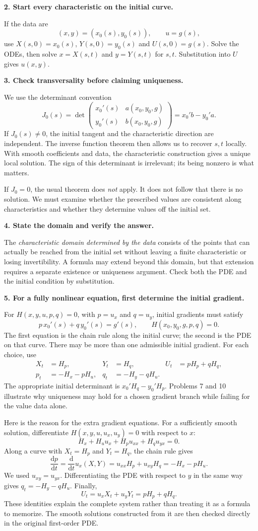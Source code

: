 \documentclass[11pt,a4paper]{article}
\newcommand{\step}[1]{\par\medskip\textbf{#1}\par}
\begin{document}
\step{2. Start every characteristic on the initial curve.}
If the data are
\[
 (x,y)=(x_0(s),y_0(s)),\qquad u=g(s),
\]
use $X(s,0)=x_0(s)$, $Y(s,0)=y_0(s)$ and $U(s,0)=g(s)$.
Solve the ODEs, then solve $x=X(s,t)$ and $y=Y(s,t)$ for $s,t$. Substitution into $U$ gives $u(x,y)$.

\step{3. Check transversality before claiming uniqueness.}
We use the determinant convention
\[
 J_0(s)=\det\begin{pmatrix}x_0'(s)&a(x_0,y_0,g)\\y_0'(s)&b(x_0,y_0,g)\end{pmatrix}
       =x_0'b-y_0'a.
\]
If $J_0(s)\ne0$, the initial tangent and the characteristic direction are independent. The inverse function theorem then allows us to recover $s,t$ locally. With smooth coefficients and data, the characteristic construction gives a unique local solution. The sign of this determinant is irrelevant; its being nonzero is what matters.

If $J_0=0$, the usual theorem does \emph{not} apply. It does not follow that there is no solution. We must examine whether the prescribed values are consistent along characteristics and whether they determine values off the initial set.

\step{4. State the domain and verify the answer.}
The \emph{characteristic domain determined by the data} consists of the points that can actually be reached from the initial set without leaving a finite characteristic or losing invertibility. A formula may extend beyond this domain, but that extension requires a separate existence or uniqueness argument. Check both the PDE and the initial condition by substitution.

\step{5. For a fully nonlinear equation, first determine the initial gradient.}
For $H(x,y,u,p,q)=0$, with $p=u_x$ and $q=u_y$, initial gradients must satisfy
\[
 p\,x_0'(s)+q\,y_0'(s)=g'(s),\qquad H(x_0,y_0,g,p,q)=0.
\]
The first equation is the chain rule along the initial curve; the second is the PDE on that curve. There may be more than one admissible initial gradient. For each choice, use
\begin{align*}
 X_t&=H_p,&Y_t&=H_q,&U_t&=pH_p+qH_q,\\
 p_t&=-H_x-pH_u,&q_t&=-H_y-qH_u.
\end{align*}
The appropriate initial determinant is $x_0'H_q-y_0'H_p$. Problems 7 and 10 illustrate why uniqueness may hold for a chosen gradient branch while failing for the value data alone.

Here is the reason for the extra gradient equations. For a sufficiently smooth solution, differentiate $H(x,y,u,u_x,u_y)=0$ with respect to $x$:
\[
 H_x+H_u u_x+H_p u_{xx}+H_q u_{yx}=0.
\]
Along a curve with $X_t=H_p$ and $Y_t=H_q$, the chain rule gives
\[
 \frac{\mathrm dp}{\mathrm dt}
 =\frac{\mathrm d}{\mathrm dt}u_x(X,Y)
 =u_{xx}H_p+u_{xy}H_q=-H_x-pH_u.
\]
We used $u_{xy}=u_{yx}$. Differentiating the PDE with respect to $y$ in the same way gives $q_t=-H_y-qH_u$. Finally,
\[
 U_t=u_xX_t+u_yY_t=pH_p+qH_q.
\]
These identities explain the complete system rather than treating it as a formula to memorize. The smooth solutions constructed from it are then checked directly in the original first-order PDE.
\end{document}
